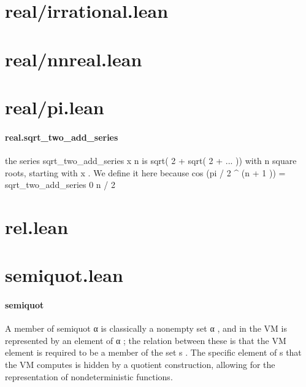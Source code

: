 \documentclass{article}
\begin{document}
\section{real/irrational.lean}\section{real/nnreal.lean}\section{real/pi.lean}\paragraph{real.sqrt\_two\_add\_series}
\par
the series 
\colorbox[RGB]{253,246,227}{{{{\color[RGB]{101, 123, 131} sqrt\_two\_add\_series x n }}}} is 
\colorbox[RGB]{253,246,227}{{{{\color[RGB]{101, 123, 131} sqrt( }}}{{{\color[RGB]{108, 113, 196} 2 }}}{{{\color[RGB]{101, 123, 131}   }}}{{{\color[RGB]{181, 137, 0} + }}}{{{\color[RGB]{101, 123, 131}  sqrt( }}}{{{\color[RGB]{108, 113, 196} 2 }}}{{{\color[RGB]{101, 123, 131}   }}}{{{\color[RGB]{181, 137, 0} + }}}{{{\color[RGB]{101, 123, 131}  ... )) }}}} with 
\colorbox[RGB]{253,246,227}{{{{\color[RGB]{101, 123, 131} n }}}} square roots,
starting with 
\colorbox[RGB]{253,246,227}{{{{\color[RGB]{101, 123, 131} x }}}}. We define it here because 
\colorbox[RGB]{253,246,227}{{{{\color[RGB]{101, 123, 131} cos (pi  }}}{{{\color[RGB]{181, 137, 0} / }}}{{{\color[RGB]{101, 123, 131}   }}}{{{\color[RGB]{108, 113, 196} 2 }}}{{{\color[RGB]{101, 123, 131}  \textasciicircum{} (n }}}{{{\color[RGB]{181, 137, 0} + }}}{{{\color[RGB]{108, 113, 196} 1 }}}{{{\color[RGB]{101, 123, 131} ))  }}}{{{\color[RGB]{181, 137, 0} = }}}{{{\color[RGB]{101, 123, 131}  sqrt\_two\_add\_series  }}}{{{\color[RGB]{108, 113, 196} 0 }}}{{{\color[RGB]{101, 123, 131}  n  }}}{{{\color[RGB]{181, 137, 0} / }}}{{{\color[RGB]{101, 123, 131}   }}}{{{\color[RGB]{108, 113, 196} 2 }}}}\section{rel.lean}\section{semiquot.lean}\paragraph{semiquot}
\par
A member of 
\colorbox[RGB]{253,246,227}{{{{\color[RGB]{101, 123, 131} semiquot α }}}} is classically a nonempty 
\colorbox[RGB]{253,246,227}{{{{\color[RGB]{101, 123, 131} set α }}}},
and in the VM is represented by an element of 
\colorbox[RGB]{253,246,227}{{{{\color[RGB]{101, 123, 131} α }}}}; the relation
between these is that the VM element is required to be a member
of the set 
\colorbox[RGB]{253,246,227}{{{{\color[RGB]{101, 123, 131} s }}}}. The specific element of 
\colorbox[RGB]{253,246,227}{{{{\color[RGB]{101, 123, 131} s }}}} that the VM computes
is hidden by a quotient construction, allowing for the representation
of nondeterministic functions.
\end{document}
